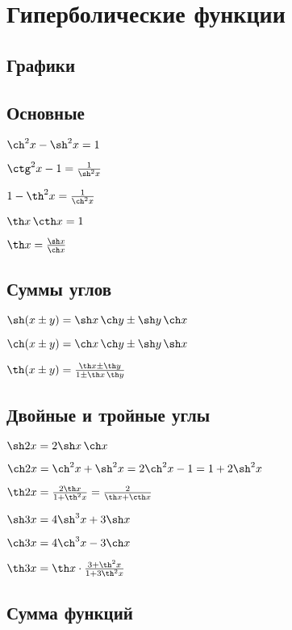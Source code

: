 
\section{Гиперболические функции}

\subsection{Графики}

\subsection{Основные}

$ \ch^2 x - \sh^2 x = 1 $

$ \ctg^2 x - 1 = \frac{1}{\sh^2 x} $

$ 1 - \th^2 x = \frac{1}{\ch^2 x} $

$ \th x \, \cth x = 1 $

$ \th x = \frac{\sh x}{\ch x} $

\subsection{Суммы углов}

$ \sh(x \pm y) = \sh x \, \ch y \pm \sh y \, \ch x $

$ \ch(x \pm y) = \ch x \, \ch y \pm \sh y \, \sh x $

$ \th(x \pm y) = \frac{\th x \pm \th y}{1 \pm \th x \, \th y} $

\subsection{Двойные и тройные углы}

$ \sh 2x = 2\sh x \, \ch x $

$ \ch 2x = \ch^2 x + \sh^2 x = 2\ch^2 x - 1 = 1 + 2\sh^2 x $

$ \th 2x = \frac{2\th x}{1 + \th^2 x} = \frac{2}{\th x + \cth x} $

$ \sh 3x = 4\sh^3 x + 3\sh x $

$ \ch 3x = 4\ch^3 x - 3\ch x $

$ \th 3x = \th x \cdot \frac{3+\th^2 x}{1 + 3\th^2 x} $

\subsection{Сумма функций}

